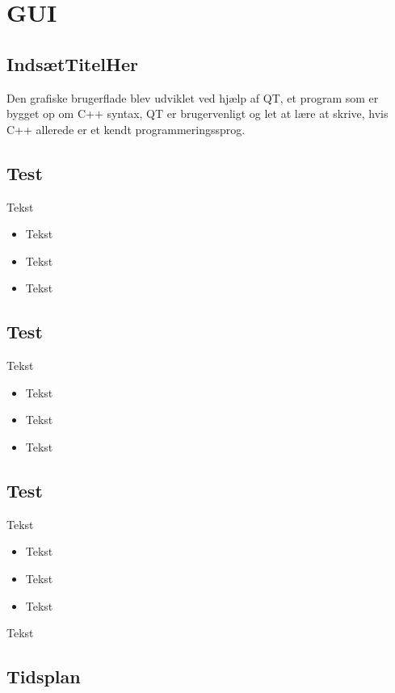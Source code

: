 \section{GUI}

\subsection{IndsætTitelHer}

Den grafiske brugerflade blev udviklet ved hjælp af QT, et program som er bygget op om C++ syntax, QT er brugervenligt og let at lære at skrive, hvis C++ allerede er et kendt programmeringssprog.\\
\subsection{Test}

Tekst
\begin{itemize}
	\item Tekst
	\item Tekst
	\item Tekst
\end{itemize}

\subsection{Test}

Tekst

\begin{itemize}
	\item Tekst
	\item Tekst
	\item Tekst

\end{itemize}


\subsection{Test}

Tekst

\begin{itemize}
	\item Tekst
	\item Tekst
	\item Tekst
\end{itemize}

Tekst


\subsection{Tidsplan}

